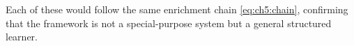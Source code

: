 Each of these would follow the same enrichment chain \eqref{eq:ch5:chain},
confirming that the framework is not a special-purpose system but a
general structured learner.







